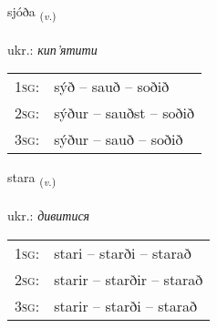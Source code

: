 \documentclass[frontgrid, backgrid]{flacards}\usepackage[]{graphicx}\usepackage[]{xcolor}
\begin{document}
\renewcommand{\flhead}{\vskip5pt \fboxsep=0pt {\small\bfseries\footnotesize Sagnorð | дієслово}}
\renewcommand{\fcfoot}{\vskip5pt \fboxsep=0pt \hspace{2pt}{\small\bfseries\footnotesize 3K}}

\renewcommand{\blhead}{\vskip5pt {\small\bfseries\footnotesize Sagnorð | дієслово }}
\renewcommand{\bcfoot}{\vskip5pt \hspace{2pt}{\small\bfseries\footnotesize 3K}}


{sjóða \small{\textsubscript{(\textit{v.})}} \\[1ex] %
\textphonetic{[sjouːða]} \\
ukr.: \emph{кип’ятити} \\  [2ex]
\renewcommand*{\arraystretch}{0.8}
\begin{tabular}{p{1cm}l}
\textsc{1sg}: & sýð -- sauð -- soðið \\ 
\textsc{2sg}: & sýður -- sauðst -- soðið \\ 
\textsc{3sg}: & sýður -- sauð -- soðið \\ 
\end{tabular}
}

\renewcommand{\flhead}{\vskip5pt \fboxsep=0pt {\small\bfseries\footnotesize Sagnorð | дієслово}}
\renewcommand{\fcfoot}{\vskip5pt \fboxsep=0pt \hspace{2pt}{\small\bfseries\footnotesize 3K}}

\renewcommand{\blhead}{\vskip5pt {\small\bfseries\footnotesize Sagnorð | дієслово }}
\renewcommand{\bcfoot}{\vskip5pt \hspace{2pt}{\small\bfseries\footnotesize 3K}}


{stara \small{\textsubscript{(\textit{v.})}} \\[1ex] %
\textphonetic{[staːra]} \\
ukr.: \emph{дивитися} \\  [2ex]
\renewcommand*{\arraystretch}{0.8}
\begin{tabular}{p{1cm}l}
\textsc{1sg}: & stari -- starði -- starað \\ 
\textsc{2sg}: & starir -- starðir -- starað \\ 
\textsc{3sg}: & starir -- starði -- starað \\ 
\end{tabular}
}
\end{document}
